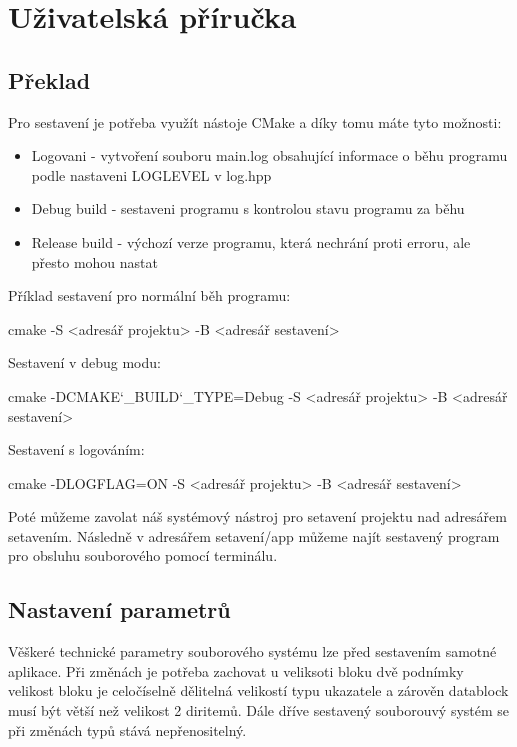 \documentclass[12pt, a4paper]{report}
\begin{document}
\chapter{Uživatelská příručka}
\section{Překlad}
Pro sestavení je potřeba využít nástoje CMake a díky tomu máte tyto možnosti:
\begin{itemize}
 \item Logovani - vytvoření souboru main.log obsahující informace o běhu programu podle nastaveni \ttfamily LOGLEVEL \normalfont v \ttfamily log.hpp \normalfont
 \item Debug build - sestaveni programu s kontrolou stavu programu za běhu
 \item Release build - výchozí verze programu, která nechrání proti erroru, ale přesto mohou nastat
\end{itemize}
Příklad sestavení pro normální běh programu:

\ttfamily cmake -S <adresář projektu> -B <adresář sestavení>

\normalfont
\noindent Sestavení v debug modu:

\ttfamily cmake -DCMAKE\char`_BUILD\char`_TYPE=Debug -S <adresář projektu> -B <adresář sestavení>

\normalfont
\noindent Sestavení s logováním:

\ttfamily cmake -DLOGFLAG=ON -S <adresář projektu> -B <adresář sestavení>

\normalfont
\noindent
Poté můžeme zavolat náš systémový nástroj pro setavení projektu nad adresářem setavením.
Následně v \ttfamily adresářem setavení/app \normalfont můžeme najít sestavený program pro obsluhu souborového pomocí terminálu.
\section{Nastavení parametrů}
Věškeré technické parametry souborového systému lze před sestavením samotné aplikace. Při změnách je potřeba zachovat u veliksoti bloku dvě podnímky velikost bloku je celočíselně dělitelná velikostí typu ukazatele a zárověn datablock musí být větší než velikost 2 diritemů. Dále dříve sestavený souborouvý systém se při změnách typů stává nepřenositelný.
\end{document}
